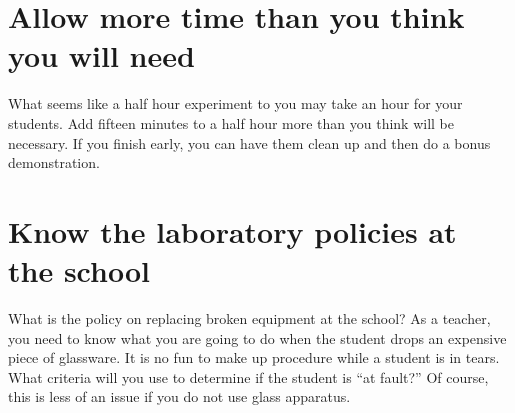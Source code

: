 \section{Allow more time than you think you will need}
What seems like a half hour experiment to you 
may take an hour for your students. 
Add fifteen minutes to a half hour more 
than you think will be necessary. 
If you finish early, 
you can have them clean up and then do a bonus demonstration.

\section{Know the laboratory policies at the school}
What is the policy on replacing broken equipment at the school? 
As a teacher, 
you need to know what you are going to do 
when the student drops an expensive piece of glassware. 
It is no fun to make up procedure while a student is in tears. 
What criteria will you use to determine if the student is “at fault?” 
Of course, 
this is less of an issue if you do not use glass apparatus.

